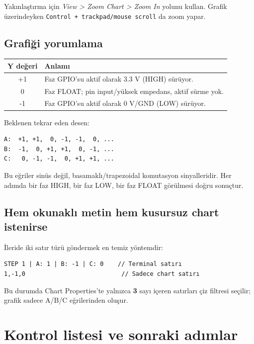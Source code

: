 \documentclass[11pt,a4paper]{article}
\begin{document}
Yakınlaştırma için \textit{View > Zoom Chart > Zoom In} yolunu kullan.
Grafik üzerindeyken \texttt{Control + trackpad/mouse scroll} da zoom yapar.

\subsection{Grafiği yorumlama}

\begin{center}
\begin{tabular}{cl}
\toprule
Y değeri & Anlamı \\
\midrule
+1 & Faz GPIO'su aktif olarak 3.3 V (HIGH) sürüyor. \\
0 & Faz FLOAT; pin input/yüksek empedans, aktif sürme yok. \\
-1 & Faz GPIO'su aktif olarak 0 V/GND (LOW) sürüyor. \\
\bottomrule
\end{tabular}
\end{center}

Beklenen tekrar eden desen:

\begin{lstlisting}
A:  +1, +1,  0, -1, -1,  0, ...
B:  -1,  0, +1, +1,  0, -1, ...
C:   0, -1, -1,  0, +1, +1, ...
\end{lstlisting}

Bu eğriler sinüs değil, basamaklı/trapezoidal komutasyon sinyalleridir.
Her adımda bir faz HIGH, bir faz LOW, bir faz FLOAT görülmesi doğru sonuçtur.

\subsection{Hem okunaklı metin hem kusursuz chart istenirse}

İleride iki satır türü göndermek en temiz yöntemdir:

\begin{lstlisting}
STEP 1 | A: 1 | B: -1 | C: 0    // Terminal satırı
1,-1,0                           // Sadece chart satırı
\end{lstlisting}

Bu durumda Chart Properties'te yalnızca \textbf{3} sayı içeren satırları çiz
filtresi seçilir; grafik sadece A/B/C eğrilerinden oluşur.

\section{Kontrol listesi ve sonraki adımlar}
\end{document}
